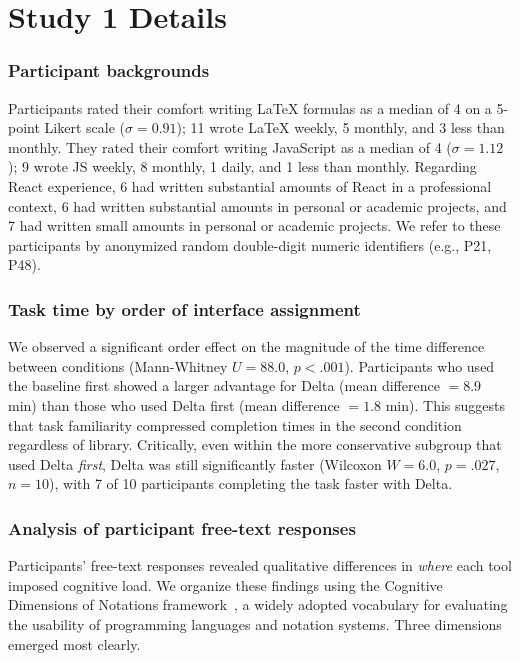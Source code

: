 \clearpage

\section{Study 1 Details}

\subsubsection{Participant backgrounds}

Participants rated their comfort writing LaTeX formulas as a median of 4 on a 5-point Likert scale ($\sigma = 0.91$); 11 wrote LaTeX weekly, 5 monthly, and 3 less than monthly. They rated their comfort writing JavaScript as a median of 4 ($\sigma = 1.12$); 9 wrote JS weekly, 8 monthly, 1 daily, and 1 less than monthly. Regarding React experience, 6 had written substantial amounts of React in a professional context, 6 had written substantial amounts in personal or academic projects, and 7 had written small amounts in personal or academic projects. We refer to these participants by anonymized random double-digit numeric identifiers (e.g., P21, P48).

\subsubsection{Task time by order of interface assignment}
\label{sec:order-effect}

We observed a significant order effect on the magnitude of the time difference between conditions (Mann-Whitney $U = 88.0$, $p < .001$). Participants who used the baseline first showed a larger advantage for Delta (mean difference $= 8.9$ min) than those who used Delta first (mean difference $= 1.8$ min). This suggests that task familiarity compressed completion times in the second condition regardless of library. Critically, even within the more conservative subgroup that used Delta \textit{first}, Delta was still significantly faster (Wilcoxon $W = 6.0$, $p = .027$, $n = 10$), with 7 of 10 participants completing the task faster with Delta.

\subsubsection{Analysis of participant free-text responses}
\label{sec:free-text-analysis}

Participants' free-text responses revealed qualitative differences in \textit{where} each tool imposed cognitive load. We organize these findings using the Cognitive Dimensions of Notations framework~\cite{Blackwell2003-gv}, a widely adopted vocabulary for evaluating the usability of programming languages and notation systems. Three dimensions emerged most clearly.

